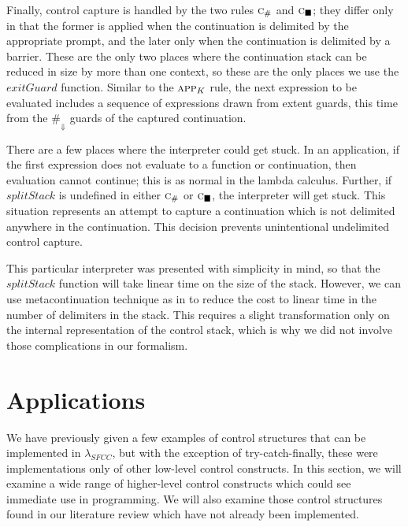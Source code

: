 \documentclass[11pt]{article}
\newcommand{\maybePage}{\null}
\begin{document}
Finally, control capture is handled by the two rules $\textsc{c}_\#$ and $\textsc{c}_\blacksquare$;
they differ only in that the former is applied when the continuation is delimited by the appropriate prompt, and the later only when the continuation is delimited by a barrier.
These are the only two places where the continuation stack can be reduced in size by more than one context, so these are the only places we use the $exitGuard$ function.
Similar to the $\textsc{app}_K$ rule, the next expression to be evaluated includes a sequence of expressions drawn from extent guards, this time from the $\#_\Downarrow$ guards of the captured continuation.

There are a few places where the interpreter could get stuck.
In an application, if the first expression does not evaluate to a function or continuation, then evaluation cannot continue; this is as normal in the lambda calculus.
Further, if $splitStack$ is undefined in either $\textsc{c}_\#$ or $\textsc{c}_\blacksquare$, the interpreter will get stuck.
This situation represents an attempt to capture a continuation which is not delimited anywhere in the continuation.
This decision prevents unintentional undelimited control capture.

This particular interpreter was presented with simplicity in mind, so that the $splitStack$ function will take linear time on the size of the stack.
However, we can use metacontinuation technique as in \cite{MFDC} to reduce the cost to linear time in the number of delimiters in the stack.
This requires a slight transformation only on the internal representation of the control stack, which is why we did not involve those complications in our formalism.

\maybePage
\section{Applications}
\label{sec:applications}

We have previously given a few examples of control structures that can be implemented in $\lambda_{SFCC}$, but with the exception of try-catch-finally, these were implementations only of other low-level control constructs.
In this section, we will examine a wide range of higher-level control constructs which could see immediate use in programming.
We will also examine those control structures found in our literature review which have not already been implemented.

\end{document}
